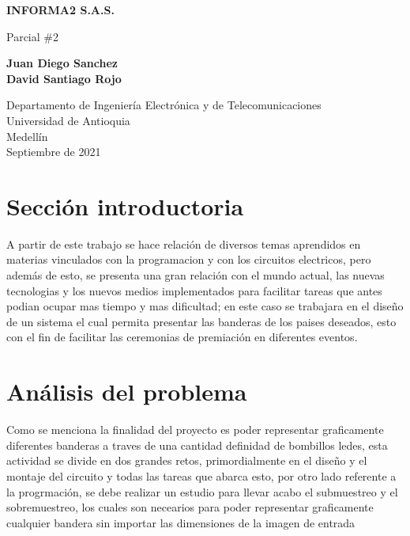 \documentclass{article}
\begin{document}
\begin{titlepage}
    \begin{center}
        \vspace*{1cm}
            
        \Huge
        \textbf{INFORMA2 S.A.S.}
            
        \vspace{0.5cm}
        \LARGE
        Parcial \#2
            
        \vspace{1.5cm}
            
        \textbf{Juan Diego Sanchez\\
                David Santiago Rojo}
            
        \vfill
            
        \vspace{0.8cm}
            
        \Large
        Departamento de Ingeniería Electrónica y de Telecomunicaciones\\
        Universidad de Antioquia\\
        Medellín\\
        Septiembre de 2021
            
    \end{center}
\end{titlepage}

\tableofcontents
\newpage

\section{Sección introductoria}\label{intro}
A partir de este trabajo se hace relación de diversos temas aprendidos en materias vinculados con la programacion y con los circuitos electricos, pero además de esto, se presenta una gran relación con el mundo actual, las nuevas tecnologias y los nuevos medios implementados para facilitar tareas que antes podian ocupar mas tiempo y mas dificultad; en este caso se trabajara en el diseño de un sistema el cual permita presentar las banderas de los paises deseados, esto con el fin de facilitar las ceremonias de premiación en diferentes eventos.

\section{Análisis del problema} \label{contenido}
Como se menciona la finalidad del proyecto es poder representar graficamente diferentes banderas a traves de una cantidad definidad de bombillos ledes, esta actividad se divide en dos grandes retos, primordialmente en el diseño y el montaje del circuito y todas las tareas que abarca esto, por otro lado referente a la progrmación, se debe realizar un estudio para llevar acabo el submuestreo y el sobremuestreo, los cuales son necearios para poder representar graficamente cualquier bandera sin importar las dimensiones de la imagen de entrada
\end{document}
